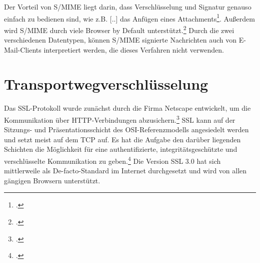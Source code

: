 \documentclass  [paper=a4,
				fontsize=12pt,
				listof=totoc,
				bibliography=totoc
				]{scrreprt}
\begin{document}
				Der Vorteil von \ac{S/MIME} liegt darin, \glqq dass Verschlüsselung und Signatur genauso einfach zu bedienen sind, wie z.B. [..] das Anfügen eines Attachments\grqq\footcite[][S. 61]{Schwenk}. Außerdem wird \ac{S/MIME} durch viele Browser by Default unterstützt.\footcite[Vgl.][]{Duevel}
				Durch die zwei verschiedenen Datentypen, können \ac{S/MIME} signierte Nachrichten auch von E-Mail-Clients interpretiert werden, die dieses Verfahren nicht verwenden. 
				\medskip
				
				\newpage
				
				
		\section{Transportwegverschlüsselung}
			Das \ac{SSL}-Protokoll wurde zunächst durch die Firma Netscape entwickelt, um die Kommunikation über \ac{HTTP}-Verbindungen abzusichern.\footcite[Vgl.][S. 796]{Eckert2013} \ac{SSL} kann auf der Sitzungs- und Präsentationsschicht des \ac{OSI}-Referenzmodells angesiedelt werden und setzt meist auf dem \ac{TCP} auf. Es hat die Aufgabe den darüber liegenden Schichten die Möglichkeit für eine authentifizierte, integritätsgeschützte und verschlüsselte Kommunikation zu geben.\footcite[Vgl.][S. 799 ff.]{Eckert2013}
			Die Version \ac{SSL} 3.0 hat sich mittlerweile als De-facto-Standard im Internet durchgesetzt und wird von allen gängigen Browsern unterstützt.\\
		
\end{document}
